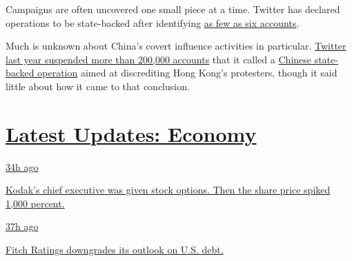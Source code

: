 Campaigns are often uncovered one small piece at a time. Twitter has
declared operations to be state-backed after identifying
\href{https://blog.twitter.com/en_us/topics/company/2019/info-ops-disclosure-data-september-2019.html}{as
few as six accounts}.

Much is unknown about China's covert influence activities in particular.
\href{https://www.nytimes.com/interactive/2019/09/18/world/asia/hk-twitter.html}{Twitter
last year suspended more than 200,000 accounts} that it called a
\href{https://www.nytimes.com/2019/08/19/technology/hong-kong-protests-china-disinformation-facebook-twitter.html}{Chinese
state-backed operation} aimed at discrediting Hong Kong's protesters,
though it said little about how it came to that conclusion.

\hypertarget{latest-updates-economy}{%
\section{\texorpdfstring{\href{https://www.nytimes.com/live/2020/07/31/business/stock-market-today-coronavirus?action=click\&pgtype=Article\&state=default\&region=MAIN_CONTENT_1\&context=storylines_live_updates}{Latest
Updates:
Economy}}{Latest Updates: Economy}}\label{latest-updates-economy}}

\href{https://www.nytimes.com/live/2020/07/31/business/stock-market-today-coronavirus?action=click\&pgtype=Article\&state=default\&region=MAIN_CONTENT_1\&context=storylines_live_updates\#kodaks-chief-executive-was-given-stock-options-then-the-share-price-spiked-1000-percent}{34h
ago}

\href{https://www.nytimes.com/live/2020/07/31/business/stock-market-today-coronavirus?action=click\&pgtype=Article\&state=default\&region=MAIN_CONTENT_1\&context=storylines_live_updates\#kodaks-chief-executive-was-given-stock-options-then-the-share-price-spiked-1000-percent}{Kodak's
chief executive was given stock options. Then the share price spiked
1,000 percent.}

\href{https://www.nytimes.com/live/2020/07/31/business/stock-market-today-coronavirus?action=click\&pgtype=Article\&state=default\&region=MAIN_CONTENT_1\&context=storylines_live_updates\#fitch-ratings-downgrades-its-outlook-on-us-debt}{37h
ago}

\href{https://www.nytimes.com/live/2020/07/31/business/stock-market-today-coronavirus?action=click\&pgtype=Article\&state=default\&region=MAIN_CONTENT_1\&context=storylines_live_updates\#fitch-ratings-downgrades-its-outlook-on-us-debt}{Fitch
Ratings downgrades its outlook on U.S. debt.}

